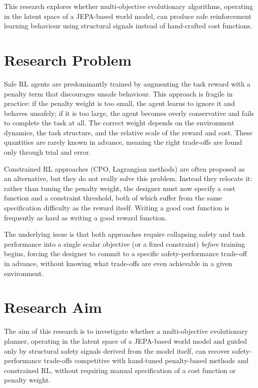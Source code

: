 \documentclass[a4paper,twoside,12pt]{article}
\begin{document}
This research explores whether multi-objective evolutionary algorithms, operating in the latent space of a JEPA-based world model, can produce safe reinforcement learning behaviour using structural signals instead of hand-crafted cost functions.

\section{Research Problem}\label{sec:problem}

Safe RL agents are predominantly trained by augmenting the task reward with a penalty term that discourages unsafe behaviour.
This approach is fragile in practice: if the penalty weight is too small, the agent learns to ignore it and behaves unsafely; if it is too large, the agent becomes overly conservative and fails to complete the task at all.
The correct weight depends on the environment dynamics, the task structure, and the relative scale of the reward and cost.
These quantities are rarely known in advance, meaning the right trade-offs are found only through trial and error.

Constrained RL approaches (CPO, Lagrangian methods) are often proposed as an alternative, but they do not really solve this problem.
Instead they relocate it: rather than tuning the penalty weight, the designer must now specify a cost function and a constraint threshold, both of which suffer from the same specification difficulty as the reward itself.
Writing a good cost function is frequently as hard as writing a good reward function.

The underlying issue is that both approaches require collapsing safety and task performance into a single scalar objective (or a fixed constraint) \emph{before} training begins, forcing the designer to commit to a specific safety-performance trade-off in advance, without knowing what trade-offs are even achievable in a given environment.

\section{Research Aim}\label{sec:aim}

The aim of this research is to investigate whether a multi-objective evolutionary planner, operating in the latent space of a JEPA-based world model and guided only by structural safety signals derived from the model itself, can recover safety-performance trade-offs competitive with hand-tuned penalty-based methods and constrained RL, without requiring manual specification of a cost function or penalty weight.
\end{document}
